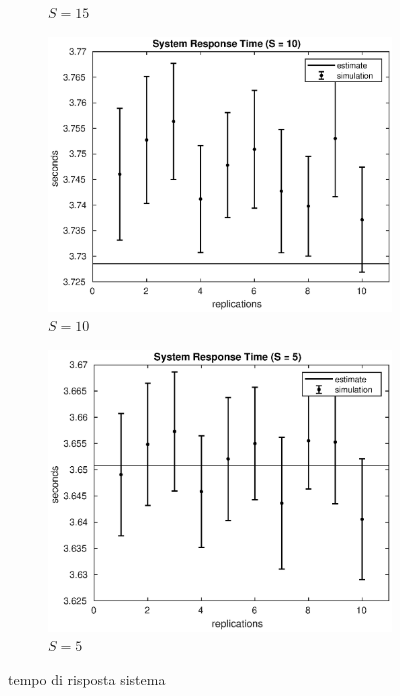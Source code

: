 \begin{figure}[!h]
\begin{subfigure}[t]{0.49\textwidth}
\caption{$S = 15$}
\label{15_s}
\end{subfigure}
%
\begin{subfigure}[t]{0.49\textwidth}
\includegraphics[width=\textwidth]{figures/simul/10_500K_s}
\caption{$S = 10$}
\label{10_s}
\end{subfigure}
%
\begin{subfigure}[t]{0.49\textwidth}
\includegraphics[width=\textwidth]{figures/simul/5_500K_s}
\caption{$S = 5$}
\label{5_s}
\end{subfigure}
%
\caption{tempo di risposta sistema}
\label{plot:s}
\end{figure}
%
%

